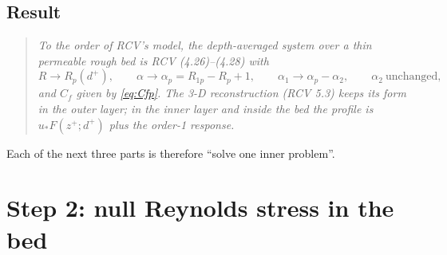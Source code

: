 \documentclass[10pt,a4paper]{article}
\newcommand{\Rp}{R_p}
\newcommand{\Rop}{R_{1p}}
\begin{document}
\subsection{Result}
\begin{quote}
\emph{To the order of RCV's model, the depth-averaged system over a thin permeable rough bed is RCV (4.26)--(4.28) with}
\begin{equation}\label{eq:map}
R\to\Rp(d^+),\qquad \alpha\to\alpha_p=\Rop-\Rp+1,\qquad \alpha_1\to\alpha_p-\alpha_2,\qquad \alpha_2\ \text{unchanged},
\end{equation}
\emph{and $C_f$ given by \eqref{eq:Cfp}. The 3-D reconstruction (RCV 5.3) keeps its form in the outer layer; in the inner layer and inside the bed the profile is $u_*F(z^+;d^+)$ plus the order-1 response.}
\end{quote}
Each of the next three parts is therefore ``solve one inner problem''.

\section{Step 2: null Reynolds stress in the bed}\label{sec:null}
\end{document}
